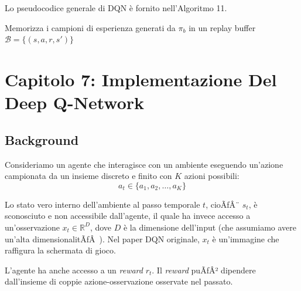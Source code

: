 ﻿\documentclass[11pt, a4paper]{report}
\begin{document}
Lo pseudocodice generale di DQN è fornito nell'Algoritmo 11.

\newpage

\begin{algorithm}[H]
\caption{Deep Q-Learning con Experience Replay}
Memorizza i campioni di esperienza generati da $\pi_b$ in un replay buffer $\mathcal{B} = \{(s, a, r, s')\}$\;
\end{algorithm}


\section{Capitolo 7: Implementazione Del Deep Q-Network}
\subsection{Background}
Consideriamo un agente che interagisce con un ambiente eseguendo un'azione campionata da un insieme discreto e finito con $K$ azioni possibili:
\begin{equation}
a_t \in \{a_1, a_2, \dots, a_K\}
\end{equation}

Lo stato vero interno dell'ambiente al passo temporale $t$, cioÃƒÂ¨ $s_t$, è sconosciuto e non accessibile dall'agente, il quale ha invece accesso a un'osservazione $x_t \in \mathbb{R}^D$, dove $D$ è la dimensione dell'input (che assumiamo avere un'alta dimensionalitÃƒÂ ). Nel paper DQN originale, $x_t$ è un'immagine che raffigura la schermata di gioco.

L'agente ha anche accesso a un \emph{reward} $r_t$. Il \emph{reward} puÃƒÂ² dipendere dall'insieme di coppie azione-osservazione osservate nel passato.
\end{document}
